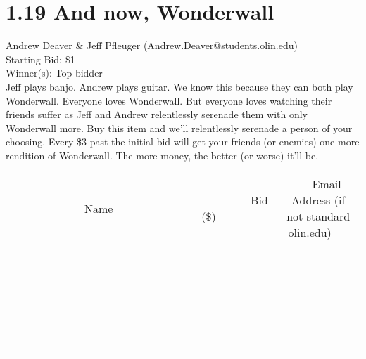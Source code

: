 \documentclass[11pt]{article}
\begin{document}
\section*{1.19 And now, Wonderwall}
Andrew Deaver \& Jeff Pfleuger (Andrew.Deaver@students.olin.edu) \\
Starting Bid: \$1 \\
Winner(s): 
Top bidder \\
Jeff plays banjo. Andrew plays guitar. We know this because they can both play Wonderwall. Everyone loves Wonderwall. But everyone loves watching their friends suffer as Jeff and Andrew relentlessly serenade them with only Wonderwall more. Buy this item and we'll relentlessly serenade a person of your choosing. Every \$3 past the initial bid will get your friends (or enemies) one more rendition of Wonderwall. The more money, the better (or worse) it'll be. \\[6ex]
\begin{tabular}{c c c}
~~~~~~~~~~~~~Name~~~~~~~~~~~~~ & ~~~~~~~~~Bid (\$)~~~~~~~~~ & ~~~Email Address (if not standard olin.edu)~~~ \\
 & & \\
\hline
 & & \\
\hline
 & & \\
\hline
 & & \\
\hline
 & & \\
\hline
 & & \\
\hline
 & & \\
\hline
 & & \\
\hline
 & & \\
\hline
 & & \\
\hline
 & & \\
\hline
 & & \\
\hline
 & & \\
\hline
 & & \\
\hline
 & & \\
\hline
 & & \\
\hline
 & & \\
\hline
 & & \\
\hline
 & & \\
\hline
 & & \\
\hline
 & & \\
\hline
 & & \\
\hline
 & & \\
\hline
 & & \\
\hline
 & & \\
\hline
 & & \\
\hline
\end{tabular}
\clearpage
\end{document}
